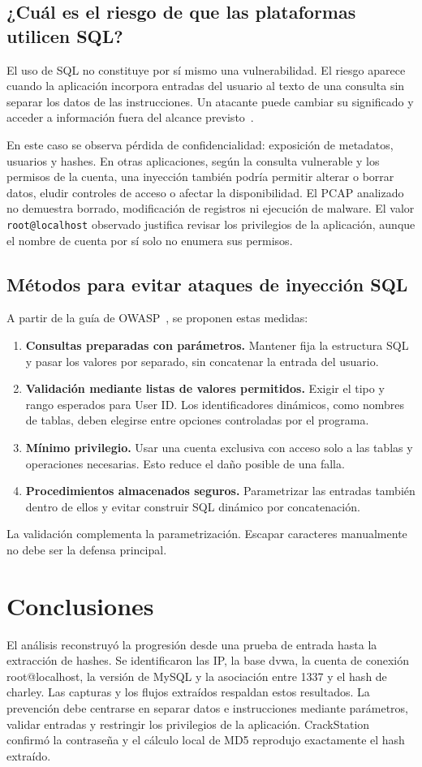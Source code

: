 \documentclass[11pt,a4paper]{article}
\begin{document}
\subsection{¿Cuál es el riesgo de que las plataformas utilicen SQL?}
El uso de SQL no constituye por sí mismo una vulnerabilidad. El riesgo aparece
cuando la aplicación incorpora entradas del usuario al texto de una consulta
sin separar los datos de las instrucciones. Un atacante puede cambiar su
significado y acceder a información fuera del alcance previsto~\cite{owasp}.

En este caso se observa pérdida de confidencialidad: exposición de metadatos,
usuarios y hashes. En otras aplicaciones, según la consulta vulnerable y los
permisos de la cuenta, una inyección también podría permitir alterar o borrar
datos, eludir controles de acceso o afectar la disponibilidad. El PCAP analizado
no demuestra borrado, modificación de registros ni ejecución de malware.
El valor \texttt{root@localhost} observado justifica revisar los privilegios de
la aplicación, aunque el nombre de cuenta por sí solo no enumera sus permisos.

\subsection{Métodos para evitar ataques de inyección SQL}
A partir de la guía de OWASP~\cite{owasp}, se proponen estas medidas:
\begin{enumerate}[noitemsep]
\item \textbf{Consultas preparadas con parámetros.} Mantener fija la estructura
SQL y pasar los valores por separado, sin concatenar la entrada del usuario.
\item \textbf{Validación mediante listas de valores permitidos.} Exigir el tipo
y rango esperados para User ID. Los identificadores dinámicos, como nombres de
tablas, deben elegirse entre opciones controladas por el programa.
\item \textbf{Mínimo privilegio.} Usar una cuenta exclusiva con acceso solo a las
tablas y operaciones necesarias. Esto reduce el daño posible de una falla.
\item \textbf{Procedimientos almacenados seguros.} Parametrizar las entradas
también dentro de ellos y evitar construir SQL dinámico por concatenación.
\end{enumerate}
La validación complementa la parametrización. Escapar caracteres manualmente
no debe ser la defensa principal.

\section{Conclusiones}
El análisis reconstruyó la progresión desde una prueba de entrada hasta la
extracción de hashes. Se identificaron las IP, la base dvwa, la cuenta de
conexión root@localhost, la versión de MySQL y la asociación entre 1337 y el
hash de charley. Las capturas y los flujos extraídos respaldan estos resultados.
La prevención debe centrarse en separar datos e instrucciones mediante
parámetros, validar entradas y restringir los privilegios de la aplicación.
CrackStation confirmó la contraseña y el cálculo local de MD5 reprodujo
exactamente el hash extraído.
\end{document}
